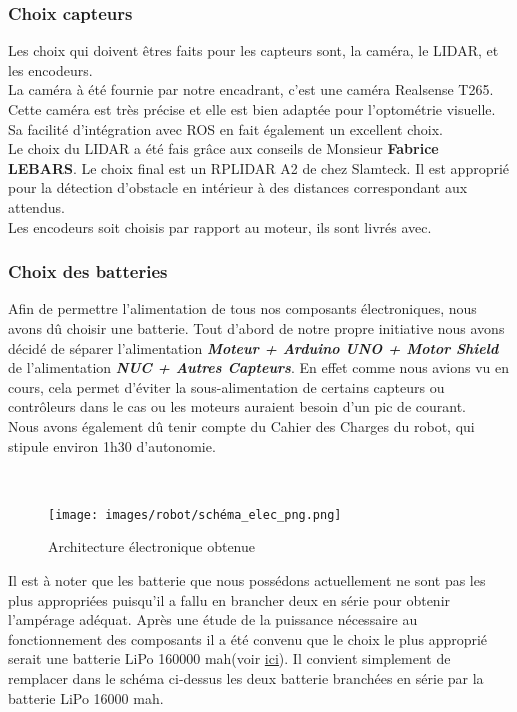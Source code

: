 \documentclass[french]{rapportENSTAB}
\begin{document}
\subsubsection{Choix capteurs}

Les choix qui doivent êtres faits pour les capteurs sont, la caméra, le LIDAR, et les encodeurs. \\
La caméra à été fournie par notre encadrant, c'est une caméra Realsense T265. Cette caméra est très précise et elle est bien adaptée pour l'optométrie visuelle. Sa facilité d'intégration avec ROS en fait également un excellent choix.\\
Le choix du LIDAR a été fais grâce aux conseils de Monsieur \textbf{Fabrice LEBARS}. Le choix final est un RPLIDAR A2 de chez Slamteck. Il est approprié pour la détection d'obstacle en intérieur à des distances correspondant aux attendus.\\
Les encodeurs soit choisis par rapport au moteur, ils sont livrés avec.




\subsubsection{Choix des batteries}
Afin de permettre l'alimentation de tous nos composants électroniques, nous avons dû choisir une batterie. Tout d'abord de notre propre initiative nous avons décidé de séparer l'alimentation \textit{\textbf{Moteur + Arduino UNO + Motor Shield}} de l'alimentation \textit{\textbf{NUC + Autres Capteurs}}. En effet comme nous avions vu en cours, cela permet d'éviter la sous-alimentation de certains capteurs ou contrôleurs dans le cas ou les moteurs auraient besoin d'un pic de courant.\\
Nous avons également dû tenir compte du Cahier des Charges du robot, qui stipule environ 1h30 d'autonomie.

\\

 \begin{figure}[H]
    \centering
    \texttt{[image: images/robot/schéma\_elec\_png.png]}
    \caption{Architecture électronique obtenue}
    \label{fig:cdcf}
\end{figure}


Il est à noter que les batterie que nous possédons actuellement ne sont pas les plus appropriées puisqu'il a fallu en brancher deux en série pour obtenir l'ampérage adéquat. Après une étude de la puissance nécessaire au fonctionnement des composants il a été convenu que le choix le plus approprié serait une batterie LiPo 160000 mah(voir  \href{https://www.iplanes-rc.fr/produit/batterie-lipo-22-2-volt-16000mah-25c/}{ici}).
Il convient simplement de remplacer dans le schéma ci-dessus les deux batterie branchées en série par la batterie LiPo 16000 mah.
\end{document}
